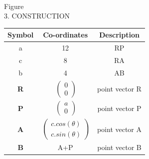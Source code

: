 \documentclass[a4paper,10pt]{report}
\begin{document}
\begin{multicols}{2}
\vspace{2mm}\\
\centering\normalsize{Figure}\vspace{5mm}\\


\centering \large\textsc{3.  C}\footnotesize\textsc{ONSTRUCTION}\vspace{5mm}\\
\begin{center}
    \label{tab:truthtable}
    \setlength{\arrayrulewidth}{0.2mm}
\setlength{\tabcolsep}{5pt}
\renewcommand{\arraystretch}{2}
    \begin{tabular}{|c|c|c|}
    \hline %
      \large\textbf{Symbol} & \large\textbf{Co-ordinates} & \large\textbf{Description}\\
      \hline
	\large a & 12 & \large RP\\
	\large c & 8 & \large RA\\
	\large b & 4 & \large AB\\
	\large\textbf R &  $\ \begin{pmatrix} 0\\0 \end{pmatrix}$  & \large point vector R\\
	\large\textbf P &  $\ \begin{pmatrix} a\\0 \end{pmatrix}$ & \large point vector P\\
	\large\textbf A &  $\ \begin{pmatrix} c.cos(\theta) \\ c. sin(\theta) \end{pmatrix}$ & \large point vector A\\ 
		\large\textbf B & {A+P}  & \large point vector B\\ 
      \hline 
   \end{tabular}
 \end{center}\vspace{10mm} 



\end{multicols}
\end{document}
